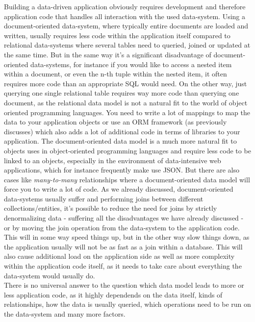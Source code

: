 {
Building a data-driven application obviously requires development and therefore application code that handles all interaction with the used data-system. Using a document-oriented data-system, where typically entire documents are loaded and written, usually requires less code within the application itself compared to relational data-systems where several tables need to queried, joined or updated at the same time. But in the same way it's a significant disadvantage of document-oriented data-systems, for instance if you would like to access a nested item within a document, or even the n-th tuple within the nested item, it often requires more code than an appropriate SQL would need. 
On the other way, just querying one single relational table requires way more code than querying one document, as the relational data model is not a natural fit to the world of object oriented programming languages. You need to write a lot of mappings to map the data to your application objects or use an ORM framework (as previously discusses) which also adds a lot of additional code in terms of libraries to your application. The document-oriented data model is a much more natural fit to objects uses in object-oriented programming languages and require less code to be linked to an objects, especially in the environment of data-intensive web applications, which for instance frequently make use JSON.
But there are also cases like \textit{many-to-many} relationships where a document-oriented data model will force you to write a lot of code. As we already discussed, document-oriented data-systems usually suffer and performing joins between different collections/entities, it's possible to reduce the need for joins by strictly denormalizing data - suffering all the disadvantages we have already discussed - or by moving the join operation from the data-system to the application code. This will in some way speed things up, but in the other way slow things down, as the application usually will not be as fast as a join within a database. This will also cause additional load on the application side as well as more complexity within the application code itself, as it needs to take care about everything the data-system would usually do.\\

There is no universal answer to the question which data model leads to more or less application code, as it highly dependends on the data itself, kinds of relationships, how the data is usually queried, which operations need to be run on the data-system and many more factors.


}
